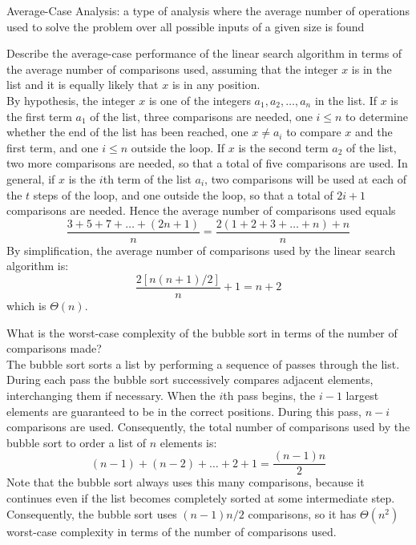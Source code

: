 \documentclass[12pt]{article}
\begin{document}
\begin{definition} Average-Case Analysis: a type of analysis where the average number of operations used to solve the problem over all possible inputs of a given size is found \end{definition} 
\begin{example} Describe the average-case performance of the linear search algorithm in terms of the average number of comparisons used, assuming that the integer $x$ is in the list and it is equally likely that $x$ is in any position. \\ 
By hypothesis, the integer $x$ is one of the integers $a_1, a_2, \dots, a_n$ in the list. If $x$ is the first term $a_1$ of the list, three comparisons are needed, one $i \leq n$ to determine whether the end of the list has been reached, one $x \neq a_i$ to compare $x$ and the first term, and one $i \leq n$ outside the loop. If $x$ is the second term $a_2$ of the list, two more comparisons are needed, so that a total of five comparisons are used. In general, if $x$ is the $i$th term of the list $a_i$, two comparisons will be used at each of the $t$ steps of the loop, and one outside the loop, so that a total of $2i + 1$ comparisons are needed. Hence the average number of comparisons used equals $$\frac{3 + 5 + 7 + \dots + (2n + 1)}{n} = \frac{2(1 + 2 + 3 + \dots + n) + n}{n} $$ By simplification, the average number of comparisons used by the linear search algorithm is: $$  \frac{2[n(n + 1)/2]}{n} + 1 = n + 2 $$ which is $\Theta(n)$. \end{example} 
\begin{example} What is the worst-case complexity of the bubble sort in terms of the number of comparisons made? \\ The bubble sort sorts a list by performing a sequence of passes through the list. During each pass the bubble sort successively compares adjacent elements, interchanging them if necessary. When the $i$th pass begins, the $i - 1$ largest elements are guaranteed to be in the correct positions. During this pass, $n - i$ comparisons are used. Consequently, the total number of comparisons used by the bubble sort to order a list of $n$ elements is: $$(n - 1) + (n - 2) + \dots + 2 + 1 = \frac{(n - 1)n}{2} $$ Note that the bubble sort always uses this many comparisons, because it continues even if the list becomes completely sorted at some intermediate step. Consequently, the bubble sort uses $(n - 1)n/2$ comparisons, so it has $\Theta(n^2)$ worst-case complexity in terms of the number of comparisons used. \end{example} 
\end{document}
